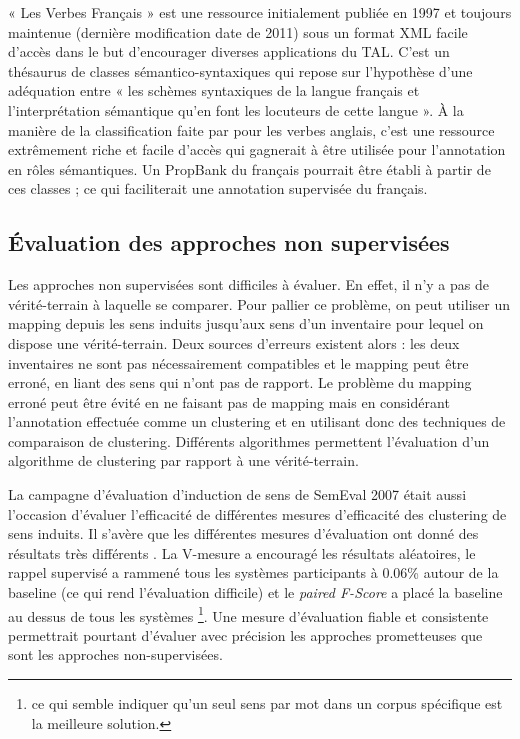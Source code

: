 « Les Verbes Français » est une ressource initialement publiée en 1997 et
toujours maintenue (dernière modification date de 2011) sous un format XML
facile d'accès dans le but d'encourager diverses applications du TAL. C'est un
thésaurus de classes sémantico-syntaxiques qui repose sur l'hypothèse d'une
adéquation entre « les schèmes syntaxiques de la langue français et
l'interprétation sémantique qu'en font les locuteurs de cette langue ». À la
manière de la classification faite par \cite{levin1993english} pour les verbes
anglais, c'est une ressource extrêmement riche et facile d'accès qui gagnerait
à être utilisée pour l'annotation en rôles sémantiques. Un PropBank du français
pourrait être établi à partir de ces classes ; ce qui faciliterait une
annotation supervisée du français.

\subsection{Évaluation des approches non supervisées}
\label{evalunsupervised}

Les approches non supervisées sont difficiles à évaluer. En effet, il n'y a pas
de vérité-terrain à laquelle se comparer. Pour pallier ce problème, on peut
utiliser un mapping depuis les sens induits jusqu'aux sens d'un inventaire pour
lequel on dispose une vérité-terrain. Deux sources d'erreurs existent alors :
les deux inventaires ne sont pas nécessairement compatibles et le mapping peut
être erroné, en liant des sens qui n'ont pas de rapport. Le problème du mapping
erroné peut être évité en ne faisant pas de mapping mais en considérant
l'annotation effectuée comme un clustering et en utilisant donc des techniques
de comparaison de clustering. Différents algorithmes permettent l'évaluation
d'un algorithme de clustering par rapport à une vérité-terrain.

La campagne d'évaluation d'induction de sens de SemEval 2007
\citep{manandhar2010semeval} était aussi l'occasion d'évaluer l'efficacité de
différentes mesures d'efficacité des clustering de sens induits. Il s'avère que
les différentes mesures d'évaluation ont donné des résultats très différents
\citep{pedersen2010duluth}. La V-mesure a encouragé les résultats aléatoires,
le rappel supervisé a rammené tous les systèmes participants à 0.06\% autour de
la baseline (ce qui rend l'évaluation difficile) et le \textit{paired F-Score}
a placé la baseline au dessus de tous les systèmes \footnote{ce qui semble
indiquer qu'un seul sens par mot dans un corpus spécifique est la meilleure
solution.}. Une mesure d'évaluation fiable et consistente permettrait pourtant
d'évaluer avec précision les approches prometteuses que sont les approches
non-supervisées.

